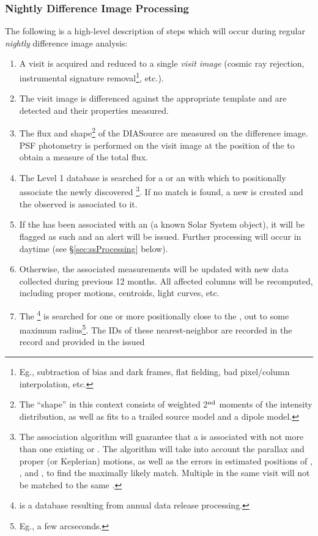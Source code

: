 \subsubsection{Nightly Difference Image Processing \label{sec:ssProcessing}}

The following is a high-level description of steps which will occur during regular {\em nightly}
difference image analysis:
\begin{enumerate}
\item A visit is acquired and reduced to a single {\em visit image} (cosmic ray rejection, instrumental signature removal\footnote{Eg., subtraction of bias and dark frames, flat fielding, bad pixel/column interpolation, etc.}, etc.).
\item The visit image is differenced against the appropriate template and \DIASources are detected and
their properties measured.
\item The flux and shape\footnote{The ``shape'' in this context consists of weighted 2$^{\rm nd}$ moments
of the intensity distribution, as well as fits to a trailed source model and a dipole model.} of the DIASource are measured on the difference image. PSF photometry is performed on the visit image at the position of the \DIASource to obtain a measure of the total flux.
\item The Level 1 database is searched for a \DIAObject or an \SSObject with which to positionally associate the newly discovered \DIASource\footnote{The association algorithm will guarantee that a \DIASource is associated with not more than one existing \DIAObject or \SSObject. The algorithm will take into account the parallax and proper (or Keplerian) motions, as well as the errors in estimated positions of \DIAObject, \SSObject, and \DIASource, to find the maximally likely match. Multiple \DIASources in the same visit will not be matched to the same \DIAObject.}. If no match is found, a new \DIAObject is created and the observed \DIASource is associated to it.
\item If the \DIASource has been associated with an \SSObject (a known Solar System object), it will be flagged as such and an alert will be issued. Further processing will occur in daytime (see \S\ref{sec:ssProcessing} below).
\item Otherwise, the associated \DIAObject measurements will be updated with new data
collected during previous 12 months. All affected columns will be recomputed, including proper motions, centroids, light curves, etc.
\item The \DR\footnote{\DR is a database resulting from annual data release processing.} is searched for one or more \Objects positionally close to the \DIAObject, out to some maximum radius\footnote{Eg., a few arcseconds.}. The IDs of these nearest-neighbor \Objects are recorded in the \DIAObject record and provided in the issued

\end{enumerate}
